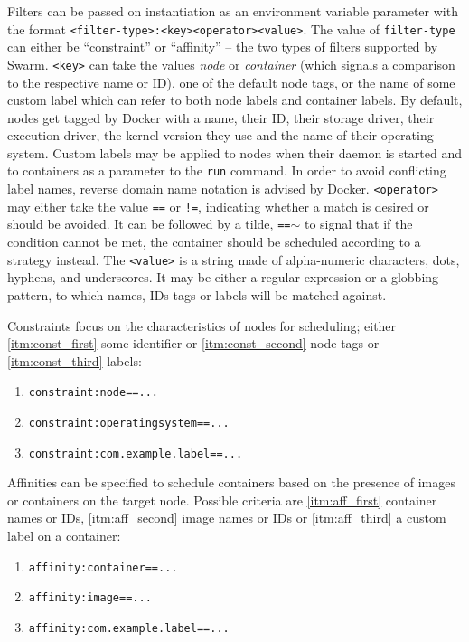     Filters can be passed on instantiation as an environment variable parameter with the format \texttt{<filter-type>:<key><operator><value>}. The value of \texttt{filter-type} can either be ``constraint'' or ``affinity'' -- the two types of filters supported by Swarm.
    \texttt{<key>} can take the values \emph{node} or \emph{container} (which signals a comparison to the respective name or \ac{ID}), one of the default node tags, or the name of some custom label which can refer to both node labels and container labels. By default, nodes get tagged by Docker with a name, their \ac{ID}, their storage driver, their execution driver, the kernel version they use and the name of their operating system.
    Custom labels may be applied to nodes when their daemon is started and to containers as a parameter to the \texttt{run} command. In order to avoid conflicting label names, reverse domain name notation is advised by Docker.
    \texttt{<operator>} may either take the value \texttt{==} or \texttt{!=}, indicating whether a match is desired or should be avoided. It can be followed by a tilde, \eg \texttt{==$\sim$} to signal that if the condition cannot be met, the container should be scheduled according to a strategy instead.
    The \texttt{<value>} is a string made of alpha-numeric characters, dots, hyphens, and underscores. It may be either a regular expression or a globbing pattern, to which names, \acp{ID} tags or labels will be matched against.

    Constraints focus on the characteristics of nodes for scheduling; either \ref{itm:const_first} some identifier or \ref{itm:const_second} node tags or \ref{itm:const_third} labels:

    \begin{enumerate}[label=\alph*), nosep]
      \item \label{itm:const_first} \texttt{constraint:node==...}
      \item \label{itm:const_second} \texttt{constraint:operatingsystem==...}
      \item \label{itm:const_third} \texttt{constraint:com.example.label==...}
    \end{enumerate}

    Affinities can be specified to schedule containers based on the presence of images or containers on the target node. Possible criteria are \ref{itm:aff_first} container names or \acp{ID}, \ref{itm:aff_second} image names or \acp{ID} or \ref{itm:aff_third} a custom label on a container:

    \begin{enumerate}[label=\alph*), nosep]
      \item \label{itm:aff_first} \texttt{affinity:container==...}
      \item \label{itm:aff_second} \texttt{affinity:image==...}
      \item \label{itm:aff_third} \texttt{affinity:com.example.label==...}
    \end{enumerate}

